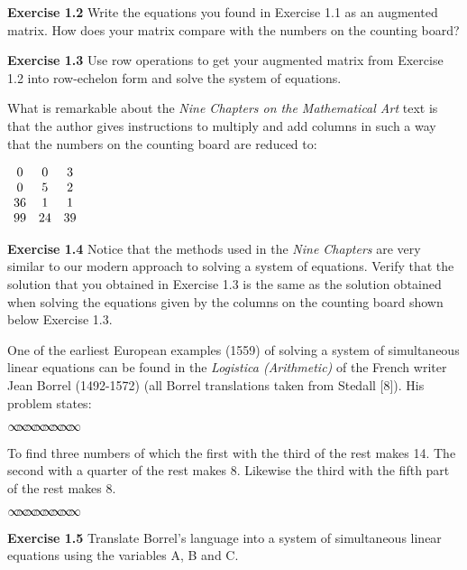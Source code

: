 \documentclass[11pt]{article}%
\theoremstyle{definition}
\newcommand{\sep}{\vspace{-3pt} \begin{center}
{\mathversion{normal}
$\infty \mspace{-5.5mu} \infty \mspace{-5.5mu}
\infty \mspace{-5.5mu} \infty \mspace{-5.5mu}
\infty \mspace{-5.5mu} \infty \mspace{-5.5mu}
\infty \mspace{-5.5mu} \infty$}
\end{center} \vspace{-3pt}}
\begin{document}
\bigskip\noindent\textbf{Exercise 1.2} Write the equations you found in
Exercise 1.1 as an augmented matrix. How does your matrix compare with the
numbers on the counting board?

\bigskip\noindent\textbf{Exercise 1.3} Use row operations to get your
augmented matrix from Exercise 1.2 into row-echelon form and solve the system
of equations.

\bigskip

What is remarkable about the \textit{Nine Chapters on the Mathematical Art}
text is that the author gives instructions to multiply and add columns in such
a way that the numbers on the counting board are reduced to:

\begin{center}
$%
\begin{array}
[c]{ccc}%
0 & 0 & 3\\
0 & 5 & 2\\
36 & 1 & 1\\
99 & 24 & 39
\end{array}
$
\end{center}

\noindent\textbf{Exercise 1.4} Notice that the methods used in the
\textit{Nine Chapters} are very similar to our modern approach to solving a
system of equations. Verify that the solution that you obtained in Exercise
1.3 is the same as the solution obtained when solving the equations given by
the columns on the counting board shown below Exercise 1.3.

\bigskip

One of the earliest European examples (1559) of solving a system of
simultaneous linear equations can be found in the \textit{Logistica
(Arithmetic)} of the French writer Jean Borrel (1492-1572) (all Borrel
translations taken from Stedall [8]). His problem states:%

\sep


\textsf{To find three numbers of which the first with the third of the rest
makes 14. The second with a quarter of the rest makes 8. Likewise the third
with the fifth part of the rest makes 8.}%

\sep


\noindent\textbf{Exercise 1.5} Translate Borrel's language into a system of
simultaneous linear equations using the variables A, B and C.

\bigskip
\end{document}
